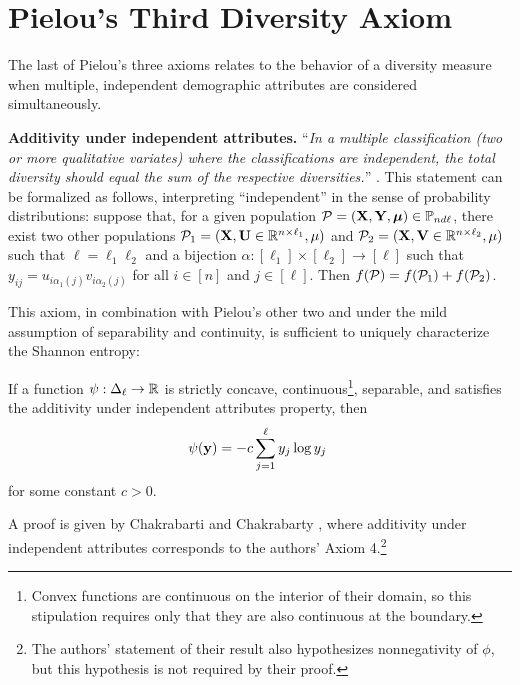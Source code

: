 
\section{Pielou's Third Diversity Axiom} \label{sec:pielou-third-axiom}

The last of Pielou's three axioms relates to the behavior of a diversity measure when multiple, independent demographic attributes are considered simultaneously.

\textbf{Additivity under independent attributes.} 
``\emph{In a multiple classification (two or more qualitative variates) where the classifications are independent, the total diversity should equal the sum of the respective diversities.}'' {\cite{pielou1977mathematical}}.  
This statement can be formalized as follows, interpreting ``independent'' in the sense of probability distributions: suppose that, for a given population $\mathcal{P} = (\mathbf{X}, \mathbf{Y}, \boldsymbol{\mu}) \in \mathbb{P}_{nd\ell}$, there exist two other populations $\mathcal{P}_1 = (\mathbf{X}, \mathbf{U} \in \mathbb{R}^{n\times \ell_1}, \mu)$ and $\mathcal{P}_2 = (\mathbf{X}, \mathbf{V} \in \mathbb{R}^{n\times \ell_2}, \mu)$ such that $\ell = \ell_1\ell_2$ and a bijection $\alpha: [\ell_1] \times [\ell_2] \rightarrow [\ell]$ such that $y_{ij} = u_{i\alpha_1(j)} v_{i\alpha_2(j)}$ for all $i \in [n]$ and $j \in [\ell]$. 
Then $f(\mathcal{P}) = f(\mathcal{P}_1) + f(\mathcal{P}_2)$.

This axiom, in combination with Pielou's other two and under the mild assumption of separability and continuity, is sufficient to uniquely characterize the Shannon entropy: 
\begin{thm}
    If a function $\psi: \Delta_{\ell} \rightarrow \mathbb{R}$ is strictly concave, continuous\footnote{Convex functions are continuous on the interior of their domain, so this stipulation requires only that they are also continuous at the boundary.}, separable,  and satisfies the additivity under independent attributes property, then  
    \begin{align}
      \psi(\mathbf{y}) = -c\sum_{j = 1}^{\ell} y_j \log y_j \; \label{eq:shannon-entropy}
    \end{align}
    for some constant $c > 0$.
\end{thm}
A proof is given by Chakrabarti and Chakrabarty {\cite{chakrabarti2005shannon}}, where additivity under independent attributes corresponds to the authors' Axiom 4.\footnote{The authors' statement of their result also hypothesizes nonnegativity of $\phi$, but this hypothesis is not required by their proof.}







